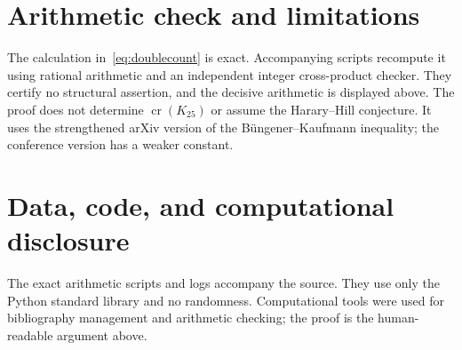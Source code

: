 \documentclass[11pt]{amsart}
\newcommand{\crn}{\operatorname{cr}}
\begin{document}
\section{Arithmetic check and limitations}
The calculation in~\eqref{eq:doublecount} is exact. Accompanying scripts
recompute it using rational arithmetic and an independent integer
cross-product checker. They certify no structural assertion, and the decisive
arithmetic is displayed above. The proof does not determine $\crn(K_{25})$
or assume the Harary--Hill conjecture. It uses the strengthened arXiv version
of the B\"ungener--Kaufmann inequality; the conference version has a weaker
constant.

\section*{Data, code, and computational disclosure}
The exact arithmetic scripts and logs accompany the source. They use only the
Python standard library and no randomness. Computational tools were used for
bibliography management and arithmetic checking; the proof is the
human-readable argument above.



\end{document}
